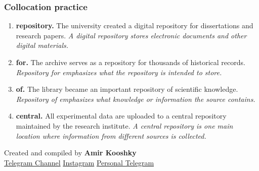 \documentclass[11pt]{article}
\begin{document}
\subsubsection{Collocation practice}
\begin{enumerate}
  \item \textbf{repository.} The university created a digital repository for dissertations and research papers. \emph{A digital repository stores electronic documents and other digital materials.}
  \item \textbf{for.} The archive serves as a repository for thousands of historical records. \emph{Repository for emphasizes what the repository is intended to store.}
  \item \textbf{of.} The library became an important repository of scientific knowledge. \emph{Repository of emphasizes what knowledge or information the source contains.}
  \item \textbf{central.} All experimental data are uploaded to a central repository maintained by the research institute. \emph{A central repository is one main location where information from different sources is collected.}
\end{enumerate}

\vfill
\begin{center}
\small\color{Muted} Created and compiled by \textbf{Amir Kooshky}\\
\href{https://t.me/KooshkyTOEFL}{Telegram Channel}\quad\textbullet\quad
\href{https://www.instagram.com/kooshkytoefl}{Instagram}\quad\textbullet\quad
\href{https://t.me/KooshkyTOEFL\_pv}{Personal Telegram}
\end{center}
\end{document}
